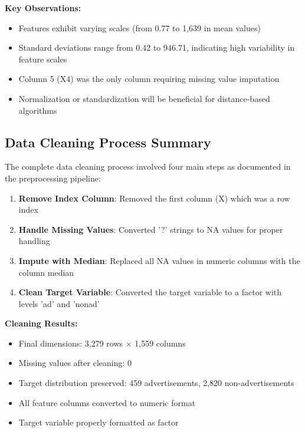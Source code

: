 \textbf{Key Observations:}
\begin{itemize}
    \item Features exhibit varying scales (from 0.77 to 1,639 in mean values)
    \item Standard deviations range from 0.42 to 946.71, indicating high variability in feature scales
    \item Column 5 (X4) was the only column requiring missing value imputation
    \item Normalization or standardization will be beneficial for distance-based algorithms
\end{itemize}

\subsection{Data Cleaning Process Summary}
The complete data cleaning process involved four main steps as documented in the preprocessing pipeline:

\begin{enumerate}
    \item \textbf{Remove Index Column}: Removed the first column (X) which was a row index
    \item \textbf{Handle Missing Values}: Converted '?' strings to NA values for proper handling
    \item \textbf{Impute with Median}: Replaced all NA values in numeric columns with the column median
    \item \textbf{Clean Target Variable}: Converted the target variable to a factor with levels 'ad' and 'nonad'
\end{enumerate}

\textbf{Cleaning Results:}
\begin{itemize}
    \item Final dimensions: 3,279 rows × 1,559 columns
    \item Missing values after cleaning: 0
    \item Target distribution preserved: 459 advertisements, 2,820 non-advertisements
    \item All feature columns converted to numeric format
    \item Target variable properly formatted as factor
\end{itemize}